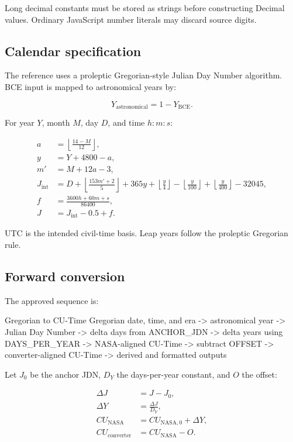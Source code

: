 \documentclass[11pt,letterpaper]{article}
\begin{document}
Long decimal constants must be stored as strings before constructing Decimal
values. Ordinary JavaScript number literals may discard source digits.

\subsection{Calendar specification}

The reference uses a proleptic Gregorian-style Julian Day Number algorithm.
BCE input is mapped to astronomical years by:

\[
Y_{\mathrm{astronomical}} = 1 - Y_{\mathrm{BCE}}.
\]

For year \(Y\), month \(M\), day \(D\), and time \(h:m:s\):

\begin{align*}
a &= \left\lfloor\frac{14-M}{12}\right\rfloor, \\
y &= Y + 4800 - a, \\
m' &= M + 12a - 3, \\
J_{\mathrm{int}} &= D + \left\lfloor\frac{153m'+2}{5}\right\rfloor
+ 365y + \left\lfloor\frac{y}{4}\right\rfloor
- \left\lfloor\frac{y}{100}\right\rfloor
+ \left\lfloor\frac{y}{400}\right\rfloor - 32045, \\
f &= \frac{3600h+60m+s}{86400}, \\
J &= J_{\mathrm{int}} - 0.5 + f.
\end{align*}

UTC is the intended civil-time basis. Leap years follow the proleptic
Gregorian rule.

\subsection{Forward conversion}

The approved sequence is:

\begin{codebox}{Gregorian to CU-Time}
Gregorian date, time, and era
  -> astronomical year
  -> Julian Day Number
  -> delta days from ANCHOR_JDN
  -> delta years using DAYS_PER_YEAR
  -> NASA-aligned CU-Time
  -> subtract OFFSET
  -> converter-aligned CU-Time
  -> derived and formatted outputs
\end{codebox}

Let \(J_0\) be the anchor JDN, \(D_Y\) the days-per-year constant, and
\(O\) the offset:

\begin{align*}
\Delta J &= J - J_0, \\
\Delta Y &= \frac{\Delta J}{D_Y}, \\
CU_{\mathrm{NASA}} &= CU_{\mathrm{NASA},0} + \Delta Y, \\
CU_{\mathrm{converter}} &= CU_{\mathrm{NASA}} - O.
\end{align*}
\end{document}
